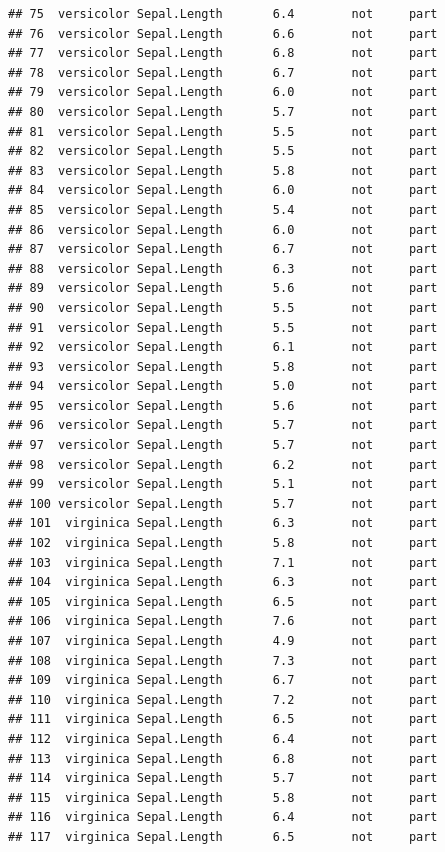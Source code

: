 \documentclass[krantz2]{krantz}\usepackage{knitr}%
\begin{document}
\begin{knitrout}
\begin{kframe}
\begin{verbatim}
## 75  versicolor Sepal.Length       6.4        not     part
## 76  versicolor Sepal.Length       6.6        not     part
## 77  versicolor Sepal.Length       6.8        not     part
## 78  versicolor Sepal.Length       6.7        not     part
## 79  versicolor Sepal.Length       6.0        not     part
## 80  versicolor Sepal.Length       5.7        not     part
## 81  versicolor Sepal.Length       5.5        not     part
## 82  versicolor Sepal.Length       5.5        not     part
## 83  versicolor Sepal.Length       5.8        not     part
## 84  versicolor Sepal.Length       6.0        not     part
## 85  versicolor Sepal.Length       5.4        not     part
## 86  versicolor Sepal.Length       6.0        not     part
## 87  versicolor Sepal.Length       6.7        not     part
## 88  versicolor Sepal.Length       6.3        not     part
## 89  versicolor Sepal.Length       5.6        not     part
## 90  versicolor Sepal.Length       5.5        not     part
## 91  versicolor Sepal.Length       5.5        not     part
## 92  versicolor Sepal.Length       6.1        not     part
## 93  versicolor Sepal.Length       5.8        not     part
## 94  versicolor Sepal.Length       5.0        not     part
## 95  versicolor Sepal.Length       5.6        not     part
## 96  versicolor Sepal.Length       5.7        not     part
## 97  versicolor Sepal.Length       5.7        not     part
## 98  versicolor Sepal.Length       6.2        not     part
## 99  versicolor Sepal.Length       5.1        not     part
## 100 versicolor Sepal.Length       5.7        not     part
## 101  virginica Sepal.Length       6.3        not     part
## 102  virginica Sepal.Length       5.8        not     part
## 103  virginica Sepal.Length       7.1        not     part
## 104  virginica Sepal.Length       6.3        not     part
## 105  virginica Sepal.Length       6.5        not     part
## 106  virginica Sepal.Length       7.6        not     part
## 107  virginica Sepal.Length       4.9        not     part
## 108  virginica Sepal.Length       7.3        not     part
## 109  virginica Sepal.Length       6.7        not     part
## 110  virginica Sepal.Length       7.2        not     part
## 111  virginica Sepal.Length       6.5        not     part
## 112  virginica Sepal.Length       6.4        not     part
## 113  virginica Sepal.Length       6.8        not     part
## 114  virginica Sepal.Length       5.7        not     part
## 115  virginica Sepal.Length       5.8        not     part
## 116  virginica Sepal.Length       6.4        not     part
## 117  virginica Sepal.Length       6.5        not     part

\end{verbatim}
\end{kframe}
\end{knitrout}
\end{document}

